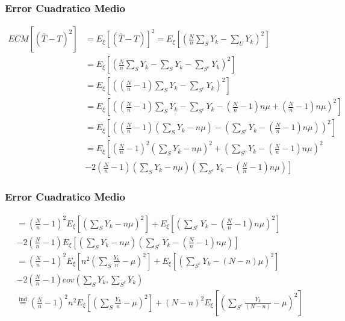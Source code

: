﻿\documentclass{beamer}
\begin{document}
\begin{frame}[allowframebreaks*]
\frametitle{Error Cuadratico Medio}
{\footnotesize
\begin{align*}
ECM[(\hat T-T)^2]&=E_\xi[(\hat T-T)]^2=E_\xi\left[\left(\frac{N}{n}\sum_SY_k-\sum_UY_k\right)^2\right]\\
&=E_\xi\left[\left(\frac{N}{n}\sum_SY_k-\sum_SY_k-\sum_{S^c}Y_k\right)^2\right]\\
&=E_\xi\left[\left(\left(\frac{N}{n}-1\right)\sum_SY_k-\sum_{S^c}Y_k\right)^2\right]\\
&=E_\xi\left[\left(\left(\frac{N}{n}-1\right)\sum_SY_k-\sum_{S^c}Y_k-\left(\frac{N}{n}-1\right)n\mu+\left(\frac{N}{n}-1\right)n\mu\right)^2\right]\\
&=E_\xi\left[\left(\left(\frac{N}{n}-1\right)\left(\sum_SY_k-n\mu\right)-\left(\sum_{S^c}Y_k-\left(\frac{N}{n}-1\right)n\mu\right)\right)^2\right]\\
&=E_\xi\left[\left(\frac{N}{n}-1\right)^2\left(\sum_SY_k-n\mu\right)^2+\left(\sum_{S^c}Y_k-\left(\frac{N}{n}-1\right)n\mu\right)^2\right. \\ &\left.-2\left(\frac{N}{n}-1\right)\left(\sum_SY_k-n\mu\right)\left(\sum_{S^c}Y_k-\left(\frac{N}{n}-1\right)n\mu\right)\right]
\end{align*}
}
\end{frame}

\begin{frame}[allowframebreaks*]
\frametitle{Error Cuadratico Medio}
{\footnotesize
\begin{align*}
&=\left(\frac{N}{n}-1\right)^2
E_\xi\left[\left(\sum_SY_k-n\mu\right)^2\right]+E_\xi\left[\left(\sum_{S^c}Y_k-\left(\frac{N}{n}-1\right)n\mu\right)^2\right] \\ &-2\left(\frac{N}{n}-1\right)E_\xi\left[\left(\sum_SY_k-n\mu\right)\left(\sum_{S^c}Y_k-\left(\frac{N}{n}-1\right)n\mu\right)\right]\\
&=\left(\frac{N}{n}-1\right)^2E_\xi\left[n^2\left(\sum_S\frac{Y_k}{n}-\mu\right)^2\right]+E_\xi\left[\left(\sum_{S^c}Y_k-\left(N-n\right)\mu\right)^2\right] \\
&-2\left(\frac{N}{n}-1\right)cov\left(\sum_SY_k,\sum_{S^c}Y_k\right)\\
&\stackrel{\text{ind}}{=}\left(\frac{N}{n}-1\right)^2 n^2E_\xi\left[\left(\sum_S\frac{Y_k}{n}-\mu\right)^2\right]+\left(N-n\right)^2E_\xi\left[\left(\sum_{S^c}\frac{Y_k}{(N-n)}-\mu\right)^2\right]
\end{align*}
}
\end{frame}
\end{document}
